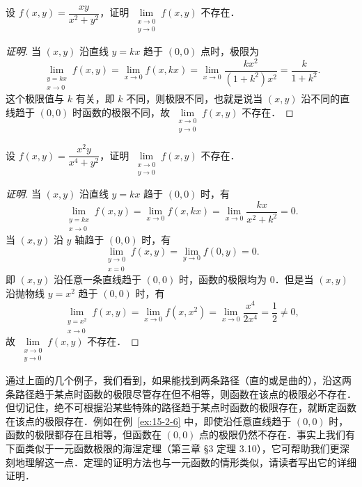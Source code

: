 \begin{example}\label{ex:15-2-5}
设 $f(x,y)=\dfrac{xy}{x^{2}+y^{2}}$，证明 $\lim\limits_{\substack{x\to0\\y\to0}}f(x,y)$ 不存在．
\end{example}

\begin{proof}[证明]
当 $(x,y)$ 沿直线 $y=kx$ 趋于 $(0,0)$ 点时，极限为
\[
\lim_{\substack{y=kx\\ x\to0}}f(x,y)=\lim_{x\to0}f(x,kx)=\lim_{x\to0}\dfrac{kx^{2}}{\left(1+k^{2}\right)x^{2}}=\dfrac{k}{1+k^{2}}.
\]
这个极限值与 $k$ 有关，即 $k$ 不同，则极限不同，也就是说当 $(x,y)$ 沿不同的直线趋于 $(0,0)$ 时函数的极限不同，故 $\lim\limits_{\substack{x\to0\\y\to0}}f(x,y)$ 不存在．
\end{proof}

\begin{example}\label{ex:15-2-6}
设 $f(x,y)=\dfrac{x^{2}y}{x^{4}+y^{2}}$，证明 $\lim\limits_{\substack{x\to0\\y\to0}}f(x,y)$ 不存在．
\end{example}

\begin{proof}[证明]
当 $(x,y)$ 沿直线 $y=kx$ 趋于 $(0,0)$ 时，有
\[
\lim_{\substack{y=kx\\ x\to0}}f(x,y)=\lim_{x\to0}f(x,kx)=\lim_{x\to0}\dfrac{kx}{x^{2}+k^{2}}=0.
\]
当 $(x,y)$ 沿 $y$ 轴趋于 $(0,0)$ 时，有
\[
\lim_{\substack{y\to0\\ x=0}}f(x,y)=\lim_{y\to0}f(0,y)=0.
\]
即 $(x,y)$ 沿任意一条直线趋于 $(0,0)$ 时，函数的极限均为 $0$．但是当 $(x,y)$ 沿抛物线 $y=x^{2}$ 趋于 $(0,0)$ 时，有
\[
\lim_{\substack{y=x^{2}\\ x\to0}}f(x,y)=\lim_{x\to0}f(x,x^{2})=\lim_{x\to0}\dfrac{x^{4}}{2x^{4}}=\dfrac{1}{2}\neq0,
\]
故 $\lim\limits_{\substack{x\to0\\y\to0}}f(x,y)$ 不存在．
\end{proof}

通过上面的几个例子，我们看到，如果能找到两条路径（直的或是曲的），沿这两条路径趋于某点时函数的极限尽管存在但不相等，则函数在该点的极限必不存在．但切记住，绝不可根据沿某些特殊的路径趋于某点时函数的极限存在，就断定函数在该点的极限存在．例如在例~\ref{ex:15-2-6} 中，即使沿任意直线趋于 $(0,0)$ 时，函数的极限都存在且相等，但函数在 $(0,0)$ 点的极限仍然不存在．事实上我们有下面类似于一元函数极限的海涅定理（第三章 §3 定理 3.10），它可帮助我们更深刻地理解这一点．定理的证明方法也与一元函数的情形类似，请读者写出它的详细证明．

